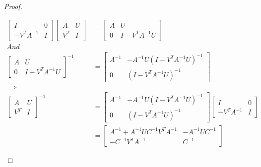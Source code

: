 \documentclass{article}
\begin{document}
\begin{proof}
  \begin{tcolorbox}[
      colback=white,colframe=black,width=14cm,arc=3mm, auto outer arc]
    \begin{align*}
      \begin{bmatrix}
        I          & 0 \\
        -V^TA^{-1} & I
      \end{bmatrix}
      \begin{bmatrix}
        A   & U \\
        V^T & I
      \end{bmatrix}
       & =
      \begin{bmatrix}
        A & U            \\
        0 & I-V^TA^{-1}U
      \end{bmatrix} \\
      And                        \\
      \begin{bmatrix}
        A & U            \\
        0 & I-V^TA^{-1}U
      \end{bmatrix}^{-1}
       & =
      \begin{bmatrix}
        A^{-1} & -A^{-1}U(I-V^TA^{-1}U)^{-1} \\
        0      & (I-V^TA^{-1}U)^{-1}
      \end{bmatrix}
      \\ \implies\\
      \begin{bmatrix}
        A   & U \\
        V^T & I
      \end{bmatrix}^{-1}
       & =
      \begin{bmatrix}
        A^{-1} & -A^{-1}U(I-V^TA^{-1}U)^{-1} \\
        0      & (I-V^TA^{-1}U)^{-1}
      \end{bmatrix}
      \begin{bmatrix}
        I          & 0 \\
        -V^TA^{-1} & I
      \end{bmatrix} \\
       & =
      \begin{bmatrix}
        A^{-1}+A^{-1}UC^{-1}V^TA^{-1} & -A^{-1}UC^{-1} \\
        -C^{-1}V^TA^{-1}              & C^{-1}
      \end{bmatrix}
    \end{align*}

\end{tcolorbox}
\end{proof}
\end{document}
